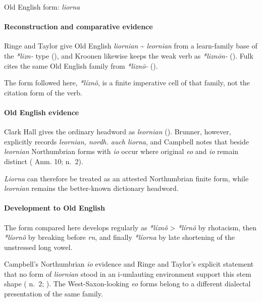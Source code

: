 \documentclass[
  british,
  a4paper,
]{article}
\begin{document}
Old English form: \emph{liorna}

\paragraph{Reconstruction and comparative
evidence}\label{reconstruction-and-comparative-evidence-61}

Ringe and Taylor give Old English \emph{liornian} \textasciitilde{}
\emph{leornian} from a learn-family base of the \emph{*lizn-} type
(), and Kroonen
likewise keeps the weak verb as \emph{*liznōn-}
(). Fulk cites the same Old
English family from \emph{*liznō-} ().

The form followed here, \emph{*líznô}, is a finite imperative cell of
that family, not the citation form of the verb.

\paragraph{Old English evidence}\label{old-english-evidence-61}

Clark Hall gives the ordinary headword as \emph{leornian}
(). Brunner, however,
explicitly records \emph{leornian, nordh. auch liorna}, and Campbell
notes that beside \emph{leornian} Northumbrian forms with \emph{io}
occur where original \emph{eo} and \emph{io} remain distinct
( Anm. 10;
 n.~2).

\emph{Liorna} can therefore be treated as an attested Northumbrian
finite form, while \emph{leornian} remains the better-known dictionary
headword.

\paragraph{Development to Old
English}\label{development-to-old-english-61}

The form compared here develops regularly as \emph{*líznô}
\textgreater{} \emph{*lírnô} by rhotacism, then \emph{*líornô} by
breaking before \emph{rn}, and finally \emph{*líorna} by late shortening
of the unstressed long vowel.

Campbell's Northumbrian \emph{io} evidence and Ringe and Taylor's
explicit statement that no form of \emph{liornian} stood in an
i-umlauting environment support this stem shape
( n.~2;
). The
West-Saxon-looking \emph{eo} forms belong to a different dialectal
presentation of the same family.
\end{document}
